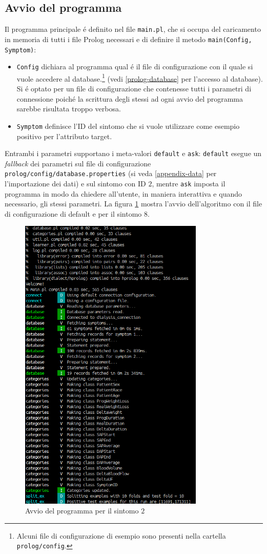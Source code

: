\documentclass[preprint]{acm_proc_article-sp}
\begin{document}
\subsection{Avvio del programma}
\label{prolog-main}
Il programma principale \'e definito nel file \verb|main.pl|, che si occupa del caricamento in memoria di tutti i file Prolog necessari e di definire il metodo \verb|main(Config, Symptom)|:
\begin{itemize}
\item \verb|Config| dichiara al programma qual \'e il file di configurazione con il quale si vuole accedere al database.\footnote{Alcuni file di configurazione di esempio sono presenti nella cartella \texttt{prolog/config}.} (vedi \ref{prolog-database} per l'accesso al database). Si \'e optato per un file di configurazione che contenesse tutti i parametri di connessione poich\'e la scrittura degli stessi ad ogni avvio del programma sarebbe risultata troppo verbosa.
\item \verb|Symptom| definisce l'ID del sintomo che si vuole utilizzare come esempio positivo per l'attributo target.
\end{itemize}

Entrambi i parametri supportano i meta-valori \verb|default| e \verb|ask|: \verb|default| esegue un \textit{fallback} dei parametri sul file di configurazione \texttt{prolog/config/database.properties} (si veda \ref{appendix-data} per l'importazione dei dati) e sul sintomo con ID $2$, mentre \verb|ask| imposta il programma in modo da chiedere all'utente, in maniera interattiva e quando necessario, gli stessi parametri. La figura \ref{fig:prolog-start} mostra l'avvio dell'algoritmo con il file di configurazione di default e per il sintomo $8$.

\begin{figure}[!htb]
\centering
\includegraphics[width=250pt]{figures/prolog-start.png}
\caption{Avvio del programma per il sintomo $2$}
\label{fig:prolog-start}
\end{figure}
\end{document}
